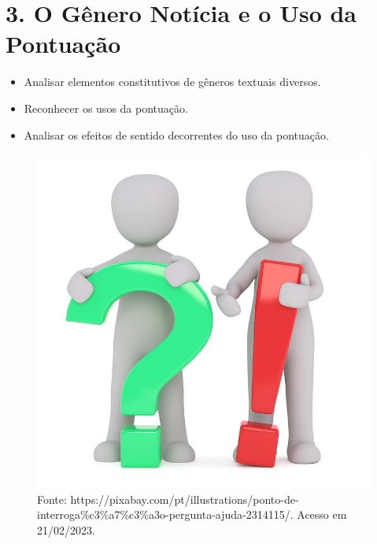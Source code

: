 \chapter{3. O Gênero Notícia e o Uso da Pontuação}



\begin{itemize}
\item Analisar elementos constitutivos de gêneros textuais diversos.

\item Reconhecer os usos da pontuação.

\item Analisar os efeitos de sentido decorrentes do uso da pontuação.
\end{itemize}

\begin{figure}[htpb!]
\includegraphics[width=.5\textwidth]{./imgs/img7.jpg}
\caption{Fonte: https://pixabay.com/pt/illustrations/ponto-de-interroga\%c3\%a7\%c3\%a3o-pergunta-ajuda-2314115/. Acesso em 21/02/2023.}
\end{figure}

